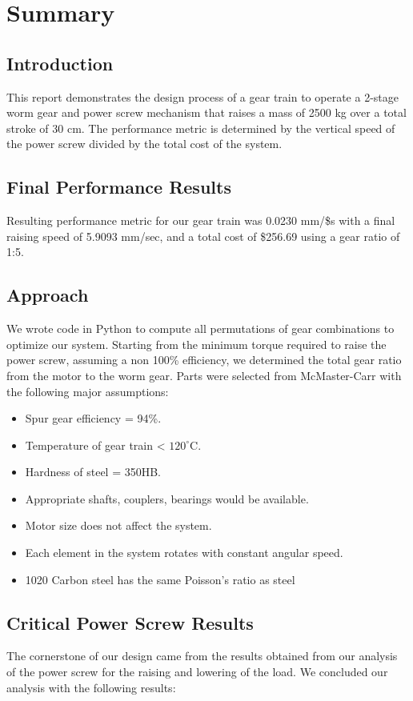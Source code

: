 \documentclass[letterpaper,12pt]{article}
\begin{document}
\section{Summary}

\subsection{Introduction}
This report demonstrates the design process of a gear train to operate a 2-stage worm gear and power screw mechanism that raises a mass of 2500 kg over a total stroke of 30 cm. The performance metric is determined by the vertical speed of the power screw divided by the total cost of the system. 

\subsection{Final Performance Results}
Resulting performance metric for our gear train was 0.0230 mm/\$s with a final raising speed of 5.9093 mm/sec, and a total cost of \$256.69 using a gear ratio of 1:5. 

\subsection{Approach}
We wrote code in Python to compute all permutations of gear combinations to optimize our system. Starting from the minimum torque required to raise the power screw, assuming a non 100\% efficiency, we determined the total gear ratio from the motor to the worm gear. Parts were selected from McMaster-Carr with the following major assumptions:
\begin{itemize}
    \item Spur gear efficiency = 94\%.
    \item Temperature of gear train < $120^{\circ}$C.
    \item Hardness of steel = 350HB.
    \item Appropriate shafts, couplers, bearings would be available.
    \item Motor size does not affect the system.
    \item Each element in the system rotates with constant angular speed.
    \item 1020 Carbon steel has the same Poisson's ratio as steel
\end{itemize}

\subsection{Critical Power Screw Results}
The cornerstone of our design came from the results obtained from our analysis of the power screw for the raising and lowering of the load. We concluded our analysis with the following results:
\end{document}
